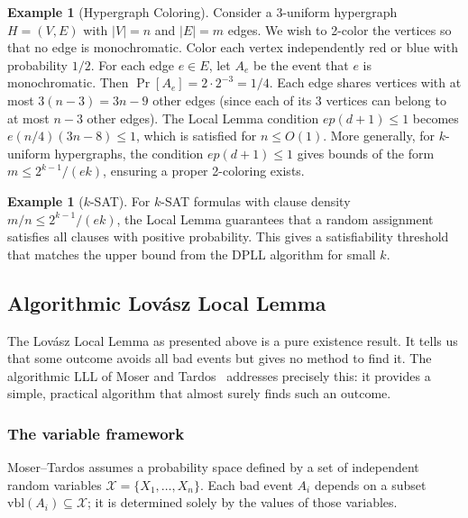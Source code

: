 \documentclass[twoside,12pt]{book}
\theoremstyle{plain}
\theoremstyle{definition}
\newtheorem{example}[theorem]{Example}
\theoremstyle{remark}
\begin{document}
\begin{example}[Hypergraph Coloring]
\label{ex:hypergraph}
Consider a 3-uniform hypergraph $H = (V, E)$ with $|V| = n$ and
$|E| = m$ edges. We wish to 2-color the vertices so that no edge is
monochromatic. Color each vertex independently red or blue with probability
$1/2$. For each edge $e \in E$, let $A_e$ be the event that $e$ is
monochromatic. Then $\Pr[A_e] = 2 \cdot 2^{-3} = 1/4$. Each edge shares
vertices with at most $3(n-3) = 3n - 9$ other edges (since each of its 3
vertices can belong to at most $n - 3$ other edges). The Local Lemma
condition $ep(d+1) \leq 1$ becomes $e(n/4)(3n - 8) \leq 1$, which is
satisfied for $n \leq O(1)$. More generally, for $k$-uniform hypergraphs,
the condition $ep(d+1) \leq 1$ gives bounds of the form $m \leq
2^{k-1} / (ek)$, ensuring a proper 2-coloring exists.
\end{example}

\begin{example}[$k$-SAT]
For $k$-SAT formulas with clause density $m/n \leq 2^{k-1}/(ek)$,
the Local Lemma guarantees that a random assignment satisfies all clauses
with positive probability. This gives a satisfiability threshold that
matches the upper bound from the DPLL algorithm for small $k$.
\end{example}

\subsection{Algorithmic Lov\'asz Local Lemma}
\label{sec:algorithmic-lll}

The Lov\'asz Local Lemma as presented above is a pure existence
result. It tells us that some outcome avoids all bad events but gives
no method to find it. The algorithmic LLL of Moser and
Tardos~\cite{mosertardos2010} addresses precisely this: it provides a
simple, practical algorithm that almost surely finds such an outcome.

\subsubsection*{The variable framework}
Moser--Tardos assumes a probability space defined by a set of
independent random variables $\mathcal{X} = \{X_1,\ldots,X_n\}$. Each
bad event $A_i$ depends on a subset $\text{vbl}(A_i) \subseteq
\mathcal{X}$; it is determined solely by the values of those variables.
\end{document}

